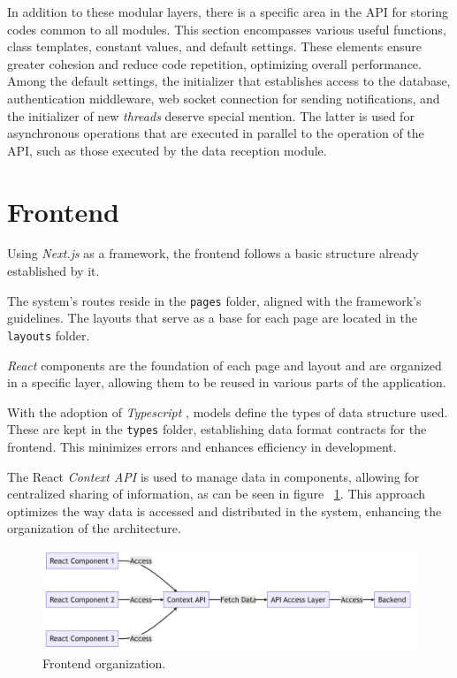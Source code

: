 In addition to these modular layers, there is a specific area in the \gls{API} for storing codes common to all modules. This section encompasses various useful functions, class templates, constant values, and default settings. These elements ensure greater cohesion and reduce code repetition, optimizing overall performance. Among the default settings, the initializer that establishes access to the database, authentication middleware, web socket connection for sending notifications, and the initializer of new \textit{threads} deserve special mention. The latter is used for asynchronous operations that are executed in parallel to the operation of the \gls{API}, such as those executed by the data reception module.

\section[Frontend]{Frontend}\label{sec:archFront}
Using \textit{Next.js} \cite{nextjsDocs} as a framework, the frontend follows a basic structure already established by it.

The system's routes reside in the \texttt{pages} folder, aligned with the framework's guidelines. The layouts that serve as a base for each page are located in the \texttt{layouts} folder.

\textit{React} components \cite{reactDocs} are the foundation of each page and layout and are organized in a specific layer, allowing them to be reused in various parts of the application.

With the adoption of \textit{Typescript} \cite{typescriptLang}, models define the types of data structure used. These are kept in the \texttt{types} folder, establishing data format contracts for the frontend. This minimizes errors and enhances efficiency in development.

The React \textit{Context API} is used to manage data in components, allowing for centralized sharing of information, as can be seen in figure ~\ref{fig:FrontendOrganization}. This approach optimizes the way data is accessed and distributed in the system, enhancing the organization of the architecture.

\begin{figure}[htbp]
	\centering
	\includegraphics[scale=0.4]{images/components_frontend.png}
	\caption{Frontend organization.}
	\label{fig:FrontendOrganization}
\end{figure}

